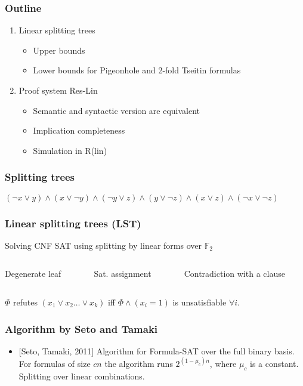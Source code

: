 \begin{frame}
    \frametitle{Outline}
    \begin{enumerate}
		\item Linear splitting trees
			\begin{itemize}
				\item Upper bounds
				\item Lower bounds for Pigeonhole and 2-fold Tseitin formulas
			\end{itemize}

		\item Proof system Res-Lin 
			\begin{itemize}
				\item Semantic and syntactic version are equivalent
				\item Implication completeness
				\item Simulation in R(lin)
			\end{itemize}

	\end{enumerate}
\end{frame}


\begin{frame}
    \frametitle{Splitting trees}
    $(\lnot x \lor y) \land (x \lor \lnot y) \land (\lnot y \lor z) \land
    	(y \lor \lnot z) \land (x \lor z) \land (\lnot x \lor \lnot z)$ 
	\only<1>{}
	\only<2>{}
\end{frame}



\begin{frame}
    \frametitle{Linear splitting trees (LST)}
	Solving CNF SAT using splitting by linear forms over $\mathbb{F}_2$
    \begin{columns}
        \begin{column}{3cm}
            Degenerate leaf
            
        \end{column}
        \begin{column}{3cm}
            Sat. assignment
            
        \end{column}
        \begin{column}{3cm}
            Contradiction with a clause
            
        \end{column}
    \end{columns}
    
	$\Phi$ refutes $(x_1 \lor x_2 \dots \lor x_k)$ iff $\Phi \land (x_i = 1)$ is
    unsatisfiable $\forall i$.
\end{frame}



\begin{frame}
    \frametitle{Algorithm by Seto and Tamaki}

	\begin{itemize}
		\item{} [Seto, Tamaki, 2011] Algorithm for Formula-SAT over the full binary
		    basis. For formulas of size $cn$ the algorithm runs $2^{(1 - \mu_c)n}$,
            where $\mu_c$ is a constant.
		\pitem Splitting over linear combinations.
	\end{itemize}    
\end{frame}